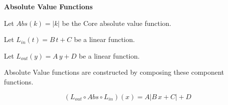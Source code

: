 \documentclass{ximera}
\begin{document}
\begin{idea} \textbf{\textcolor{blue!55!black}{Absolute Value Functions}}


Let $Abs(k) = |k| $ be the Core absolute value function.

Let $L_{in}(t) = B \, t + C$ be a linear function.

Let $L_{out}(y) = A \, y + D$ be a linear function.


Absolute Value functions are constructed by composing these component functions.


\[
(L_{out} \circ Abs \circ L_{in})(x) = A |B \,x + C| + D
\]




\end{idea}
\end{document}
